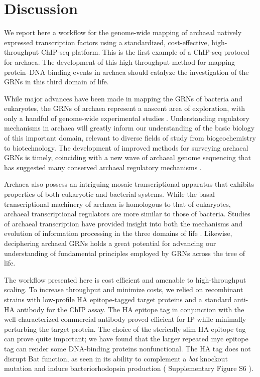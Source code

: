 \section{Discussion}

We report here a workflow for the genome-wide mapping of archaeal natively expressed transcription factors using a standardized, cost-effective, high-throughput ChIP-seq platform. This is the first example of a ChIP-seq protocol for archaea. The development of this high-throughput method for mapping protein–DNA binding events in archaea should catalyze the investigation of the GRNs in this third domain of life.

While major advances have been made in mapping the GRNs of bacteria and eukaryotes, the GRNs of archaea represent a nascent area of exploration, with only a handful of genome-wide experimental studies \cite{bonneau_predictive_2007,facciotti_general_2007,kaur_coordination_2010,schmid2011two,yoon2011parallel}. Understanding regulatory mechanisms in archaea will greatly inform our understanding of the basic biology of this important domain, relevant to diverse fields of study from biogeochemistry to biotechnology. The development of improved methods for surveying archaeal GRNs is timely, coinciding with a new wave of archaeal genome sequencing that has suggested many conserved archaeal regulatory mechanisms \cite{yoon2011parallel,gelfand_prediction_2000}.

Archaea also possess an intriguing mosaic transcriptional apparatus that exhibits properties of both eukaryotic and bacterial systems. While the basal transcriptional machinery of archaea is homologous to that of eukaryotes, archaeal transcriptional regulators are more similar to those of bacteria. Studies of archaeal transcription have provided insight into both the mechanisms and evolution of information processing in the three domains of life \cite{bell_transcription_1998,geiduschek_archaeal_2005}. Likewise, deciphering archaeal GRNs holds a great potential for advancing our understanding of fundamental principles employed by GRNs across the tree of life.

The workflow presented here is cost efficient and amenable to high-throughput scaling. To increase throughput and minimize costs, we relied on recombinant strains with low-profile HA epitope-tagged target proteins and a standard anti-HA antibody for the ChIP assay. The HA epitope tag in conjunction with the well-characterized commercial antibody proved efficient for IP while minimally perturbing the target protein. The choice of the sterically slim HA epitope tag can prove quite important; we have found that the larger repeated myc epitope tag \cite{ren2000genome} can render some DNA-binding proteins nonfunctional. The HA tag does not disrupt Bat function, as seen in its ability to complement a {\em bat} knockout mutation and induce bacteriorhodopsin production ( Supplementary Figure S6 ).

